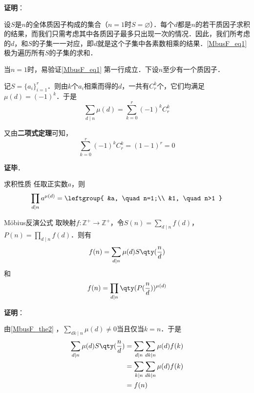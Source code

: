 \textbf{证明}：

设$S$是$n$的全体质因子构成的集合（$n=1$时$S=\varnothing$）．每个$d$都是$n$的若干质因子求积的结果，而我们只需考虑其中各质因子最多只出现一次的情况．因此，我们所考虑的$d$，和$S$的子集一一对应，即$d$就是这个子集中各素数相乘的结果．\autoref{MbusF_eq1} 极为遍历所有$S$的子集的求和．

当$n=1$时，易验证\autoref{MbusF_eq1} 第一行成立．下设$n$至少有一个质因子．

记$S=\{a_i\}_{i=1}^r$．则由$k$个$a_i$相乘而得的$d$，一共有$C^k_r$个，它们均满足$\mu(d)=(-1)^k$．于是
\begin{equation}
\sum_{d\mid n}\mu(d)=\sum_{k=0}^r(-1)^kC^k_r
\end{equation}

又由\textbf{二项式定理}可知，
\begin{equation}
\sum_{k=0}^r(-1)^kC^k_r=(1-1)^r=0
\end{equation}

\textbf{证毕}．




\begin{corollary}{求积性质}
任取正实数$a$，则
\begin{equation}
\prod_{d\mid n}a^{\mu(d)}=
\leftgroup{
    &a, \quad n=1;\\
    &1, \quad n>1
}
\end{equation}
\end{corollary}






\begin{theorem}{Möbius反演公式}
取映射$f:\mathbb{Z}^+\to\mathbb{Z}^+$，令$S(n)=\sum_{d\mid n}f(d)$，$P(n)=\prod_{d\mid n}f(d)$．则有
\begin{equation}
f(n) = \sum_{d\mid n}\mu(d)S\qty(\frac{n}{d})
\end{equation}
和
\begin{equation}
f(n) = \prod_{d\mid n}\qty(P(\frac{n}{d}))^{\mu(d)}
\end{equation}
\end{theorem}

\textbf{证明}：

由\autoref{MbusF_the2} ，$\sum_{dk\mid n}\mu(d)\neq 0$当且仅当$k=n$．于是
\begin{equation}
\begin{aligned}
\sum_{d\mid n}\mu(d)S\qty(\frac{n}{d})&=\sum_{d\mid n}\sum_{dk\mid n}\mu(d)f(k)\\
&=\sum_{k\mid n}\sum_{dk\mid n}\mu(d)f(k)\\
&=f(n)
\end{aligned}
\end{equation}

